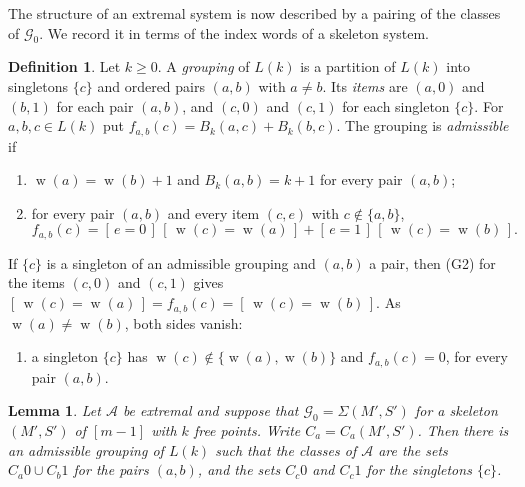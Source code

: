 \documentclass[screen]{aomart}
\newtheorem{lemma}[theorem]{Lemma}
\theoremstyle{definition}
\newtheorem{definition}[theorem]{Definition}
\theoremstyle{remark}
\numberwithin{equation}{section}
\newcommand{\cA}{\mathcal{A}}
\newcommand{\cG}{\mathcal{G}}
\newcommand{\Iv}[1]{[\,#1\,]}
\DeclareMathOperator{\wt}{w}
\begin{document}
The structure of an extremal system is now described by a pairing of the classes of $\cG_0$. We record it in terms of the index words of a skeleton system.

\begin{definition}\label{def:grouping}
Let $k\ge0$. A \emph{grouping} of $L(k)$ is a partition of $L(k)$ into singletons $\{c\}$ and ordered pairs $(a,b)$ with $a\ne b$. Its \emph{items} are $(a,0)$ and $(b,1)$ for each pair $(a,b)$, and $(c,0)$ and $(c,1)$ for each singleton $\{c\}$. For $a,b,c\in L(k)$ put $f_{a,b}(c)=B_k(a,c)+B_k(b,c)$. The grouping is \emph{admissible} if
\begin{enumerate}[label=\textup{(G\arabic*)}]
\item $\wt(a)=\wt(b)+1$ and $B_k(a,b)=k+1$ for every pair $(a,b)$;
\item for every pair $(a,b)$ and every item $(c,e)$ with $c\notin\{a,b\}$,
\[
f_{a,b}(c)=\Iv{e=0}\,\Iv{\wt(c)=\wt(a)}+\Iv{e=1}\,\Iv{\wt(c)=\wt(b)} .
\]
\end{enumerate}
\end{definition}

If $\{c\}$ is a singleton of an admissible grouping and $(a,b)$ a pair, then (G2) for the items $(c,0)$ and $(c,1)$ gives $\Iv{\wt(c)=\wt(a)}=f_{a,b}(c)=\Iv{\wt(c)=\wt(b)}$. As $\wt(a)\ne\wt(b)$, both sides vanish:
\begin{enumerate}[label=\textup{(G3)}]
\item a singleton $\{c\}$ has $\wt(c)\notin\{\wt(a),\wt(b)\}$ and $f_{a,b}(c)=0$, for every pair $(a,b)$.
\end{enumerate}

\begin{lemma}\label{lem:grouping}
Let $\cA$ be extremal and suppose that $\cG_0=\Sigma(M',S')$ for a skeleton $(M',S')$ of $[m-1]$ with $k$ free points. Write $C_a=C_a(M',S')$. Then there is an admissible grouping of $L(k)$ such that the classes of $\cA$ are the sets $C_a0\cup C_b1$ for the pairs $(a,b)$, and the sets $C_c0$ and $C_c1$ for the singletons $\{c\}$.
\end{lemma}
\end{document}
